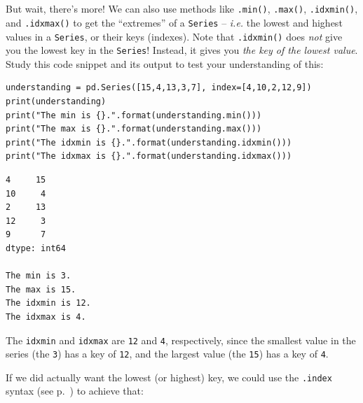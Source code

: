 
\chapter[Assoc.~arrays in Python (3 of 3)]{\LARGE\selectfont{Associative
arrays in Python (3 of 3)}}
\label{ch:assocArraysInPython3}


But wait, there's more! We can also use methods like \texttt{.min()},
\texttt{.max()}, \texttt{.idxmin()}, and \texttt{.idxmax()} to get the
``extremes'' of a \texttt{Series} -- \textit{i.e.} the lowest and highest
values in a \texttt{Series}, or their keys (indexes). Note that
\texttt{.idxmin()} does \textit{not} give you the lowest key in the
\texttt{Series}! Instead, it gives you \textit{the key of the lowest value}.
Study this code snippet and its output to test your understanding of this:


\begin{Verbatim}[fontsize=\footnotesize,samepage=true,frame=single,framesep=3mm]
understanding = pd.Series([15,4,13,3,7], index=[4,10,2,12,9])
print(understanding)
print("The min is {}.".format(understanding.min()))
print("The max is {}.".format(understanding.max()))
print("The idxmin is {}.".format(understanding.idxmin()))
print("The idxmax is {}.".format(understanding.idxmax()))
\end{Verbatim}

\begin{Verbatim}[fontsize=\footnotesize,samepage=true,frame=leftline,framesep=5mm,framerule=1mm]
4     15
10     4
2     13
12     3
9      7
dtype: int64

The min is 3.
The max is 15.
The idxmin is 12.
The idxmax is 4.
\end{Verbatim}

The \texttt{idxmin} and \texttt{idxmax} are \texttt{12} and \texttt{4},
respectively, since the smallest value in the series (the \texttt{3}) has a key
of \texttt{12}, and the largest value (the \texttt{15}) has a key of
\texttt{4}.


If we did actually want the lowest (or highest) key, we could use the
\texttt{.index} syntax (see p.~\pageref{dotIndex}) to achieve that:

